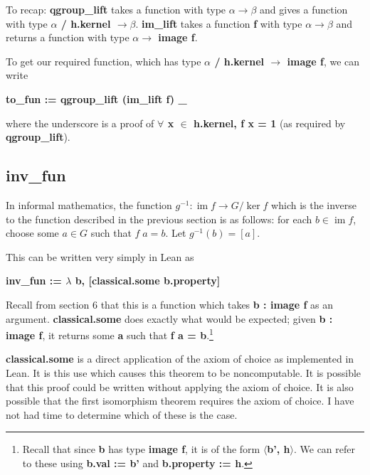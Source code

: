 \documentclass[runningheads,a4paper]{llncs}
\renewcommand{\a}{\alpha}
\renewcommand{\b}{\beta}
\renewcommand{\l}{\lambda}
\DeclareMathOperator{\im}{im}
\renewcommand{\-}{\setminus}
\begin{document}
To recap: \textbf{qgroup\_lift} takes a function with type $\a \to \b$ and gives a function with type \textbf{$\a$ / h.kernel $\to \b$}. \textbf{im\_lift} takes a function \textbf{f} with type $\a \to \b$ and returns a function with type \textbf{$\a \to$ image f}.

To get our required function, which has type \textbf{$\a$ / h.kernel $\to$ image f}, we can write

\vspace{2 mm}
\hspace{2 em}\textbf{to\_fun := qgroup\_lift (im\_lift f) \_}
\vspace{2 mm}

where the underscore is a proof of \textbf{$\forall$ x $\in$ h.kernel, f x = 1} (as required by \textbf{qgroup\_lift}).

\subsection{inv\_fun}

In informal mathematics, the function $g^{-1} : \im f \to G / \ker f$ which is the inverse to the function described in the previous section is as follows: for each $b \in \im f$, choose some $a \in G$ such that $f\; a = b$. Let $g^{-1} (b) = [a]$.

This can be written very simply in Lean as 

\vspace{2 mm}
\hspace{2 em}\textbf{inv\_fun := $\l$ b, [classical.some b.property]}
\vspace{2 mm}

Recall from section 6 that this is a function which takes \textbf{b : image f} as an argument. \textbf{classical.some} does exactly what would be expected; given \textbf{b : image f}, it returns some \textbf{a} such that \textbf{f a = b}.\footnote{Recall that since \textbf{b} has type \textbf{image f}, it is of the form \textbf{$\langle$b', h$\rangle$}. We can refer to these using \textbf{b.val := b'} and \textbf{b.property := h}.}

\textbf{classical.some} is a direct application of the axiom of choice as implemented in Lean. It is this use which causes this theorem to be noncomputable. It is possible that this proof could be written without applying the axiom of choice. It is also possible that the first isomorphism theorem requires the axiom of choice. I have not had time to determine which of these is the case.
\end{document}
